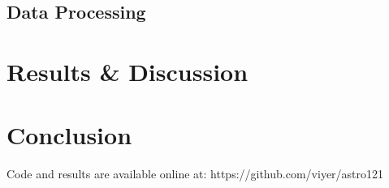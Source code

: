 \documentclass{article}
\begin{document}
  \subsection{Data Processing}


\section{Results \& Discussion}


\section{Conclusion}

Code and results are available online at: https://github.com/viyer/astro121

%   
%   
\end{document}
